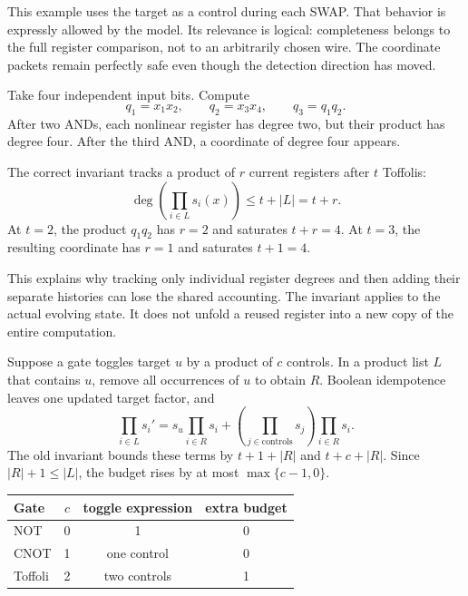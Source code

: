 This example uses the target as a control during each SWAP. That behavior
is expressly allowed by the model. Its relevance is logical: completeness
belongs to the full register comparison, not to an arbitrarily chosen wire.
The coordinate packets remain perfectly safe even though the detection
direction has moved.


Take four independent input bits. Compute
\[
 q_1=x_1x_2,\qquad q_2=x_3x_4,\qquad q_3=q_1q_2.
\]
After two ANDs, each nonlinear register has degree two, but their product
has degree four. After the third AND, a coordinate of degree four appears.


The correct invariant tracks a product of $r$ current registers after $t$
Toffolis:
\[
 \deg\!\left(\prod_{i\in L}s_i(x)\right)\le t+|L|=t+r.
\]
At $t=2$, the product $q_1q_2$ has $r=2$ and saturates $t+r=4$. At $t=3$,
the resulting coordinate has $r=1$ and saturates $t+1=4$.

This explains why tracking only individual register degrees and then
adding their separate histories can lose the shared accounting. The
invariant applies to the actual evolving state. It does not unfold a
reused register into a new copy of the entire computation.


Suppose a gate toggles target $u$ by a product of $c$ controls. In a product
list $L$ that contains $u$, remove all occurrences of $u$ to obtain $R$.
Boolean idempotence leaves one updated target factor, and
\[
 \prod_{i\in L}s_i'=
 s_u\prod_{i\in R}s_i+
 \left(\prod_{j\in\mathrm{controls}}s_j\right)\prod_{i\in R}s_i.
\]
The old invariant bounds these terms by $t+1+|R|$ and $t+c+|R|$.
Since $|R|+1\le |L|$, the budget rises by at most $\max\{c-1,0\}$.

\begin{center}
\begin{tabular}{@{}lccc@{}}\toprule
Gate & $c$ & toggle expression & extra budget\\\midrule
NOT & 0 & 1 & 0\\
CNOT & 1 & one control & 0\\
Toffoli & 2 & two controls & 1\\\bottomrule
\end{tabular}
\end{center}

